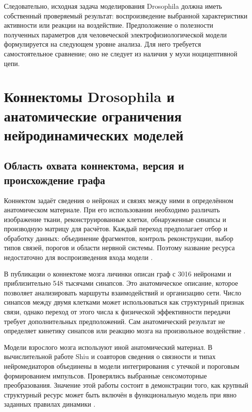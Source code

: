Следовательно, исходная задача моделирования Drosophila должна иметь собственный проверяемый результат: воспроизведение выбранной характеристики активности или реакции на воздействие. Предположение о полезности полученных параметров для человеческой электрофизиологической модели формулируется на следующем уровне анализа. Для него требуется самостоятельное сравнение; оно не следует из наличия у мухи ноцицептивной цепи.

\section{Коннектомы Drosophila и анатомические ограничения нейродинамических моделей}
\label{sec:connectomes}

\subsection{Область охвата коннектома, версия и происхождение графа}

Коннектом задаёт сведения о нейронах и связях между ними в определённом анатомическом материале. При его использовании необходимо различать изображение ткани, реконструированные клетки, обнаруженные синапсы и производную матрицу для расчётов. Каждый переход предполагает отбор и обработку данных: объединение фрагментов, контроль реконструкции, выбор типов связей, порогов и области нервной системы. Поэтому название ресурса недостаточно для воспроизведения входа модели \cite{s904,s774,s738}.

В публикации о коннектоме мозга личинки описан граф с 3016 нейронами и приблизительно 548 тысячами синапсов. Это анатомическое описание, которое позволяет анализировать маршруты взаимодействий и организацию сети. Число синапсов между двумя клетками может использоваться как структурный признак связи, однако переход от этого числа к физической эффективности передачи требует дополнительных предположений. Сам анатомический результат не определяет кинетику синапсов или реакцию мозга на произвольное воздействие \cite{s904}.

Модели взрослого мозга используют иной анатомический материал. В вычислительной работе Shiu и соавторов сведения о связности и типах нейромедиаторов объединены в модели интегрирования с утечкой и пороговым формированием импульсов. Проверялись выбранные сенсомоторные преобразования. Значение этой работы состоит в демонстрации того, как крупный структурный ресурс может быть включён в функциональную модель при явно заданных правилах динамики \cite{s775}.

